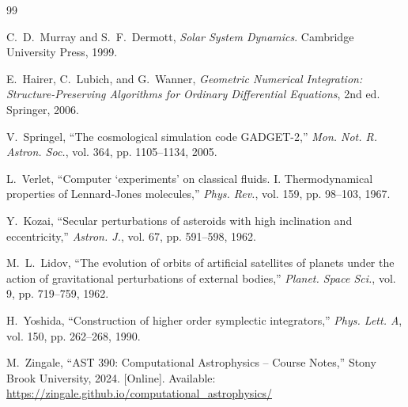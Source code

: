 \documentclass[twocolumn,10pt]{article}
\begin{document}
\begin{thebibliography}{99}

C.~D.~Murray and S.~F.~Dermott,
\textit{Solar System Dynamics}.
Cambridge University Press, 1999.

E.~Hairer, C.~Lubich, and G.~Wanner,
\textit{Geometric Numerical Integration: Structure-Preserving Algorithms for Ordinary Differential Equations},
2nd ed. Springer, 2006.

V.~Springel,
``The cosmological simulation code GADGET-2,''
\textit{Mon. Not. R. Astron. Soc.}, vol. 364, pp. 1105--1134, 2005.

L.~Verlet,
``Computer `experiments' on classical fluids. I. Thermodynamical properties of Lennard-Jones molecules,''
\textit{Phys. Rev.}, vol. 159, pp. 98--103, 1967.

Y.~Kozai,
``Secular perturbations of asteroids with high inclination and eccentricity,''
\textit{Astron. J.}, vol. 67, pp. 591--598, 1962.

M.~L.~Lidov,
``The evolution of orbits of artificial satellites of planets under the action of gravitational perturbations of external bodies,''
\textit{Planet. Space Sci.}, vol. 9, pp. 719--759, 1962.

H.~Yoshida,
``Construction of higher order symplectic integrators,''
\textit{Phys. Lett. A}, vol. 150, pp. 262--268, 1990.

M.~Zingale,
``AST 390: Computational Astrophysics -- Course Notes,''
Stony Brook University, 2024. [Online].
Available: \url{https://zingale.github.io/computational_astrophysics/}

\end{thebibliography}
\end{document}
